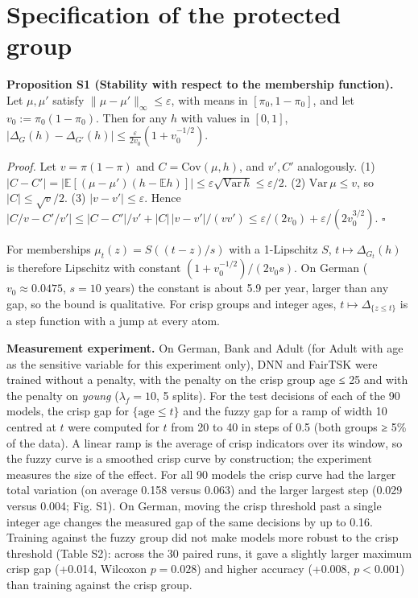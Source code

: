 \hypertarget{specification-of-the-protected-group}{%
\section{Specification of the protected group}\label{specification-of-the-protected-group}}

\textbf{Proposition S1 (Stability with respect to the membership function).} Let \(\mu,\mu'\) satisfy \(\|\mu - \mu'\|_{\infty} \leq \varepsilon\), with means in \([\pi_{0},1 - \pi_{0}]\), and let \(v_{0} := \pi_{0}(1 - \pi_{0})\). Then for any \(h\) with values in \([0,1]\), \(|\Delta_{G}(h) - \Delta_{G'}(h)| \leq \frac{\varepsilon}{2v_{0}}(1 + v_{0}^{-1/2})\).

\emph{Proof.} Let \(v = \pi(1 - \pi)\) and \(C = \mathrm{Cov}(\mu,h)\), and \(v',C'\) analogously. (1) \(|C - C'| = |\mathbb{E}[(\mu - \mu')(h - \mathbb{E}h)]| \leq \varepsilon\sqrt{\mathrm{Var}\,h} \leq \varepsilon/2\). (2) \(\mathrm{Var}\,\mu \leq v\), so \(|C| \leq \sqrt{v}/2\). (3) \(|v - v'| \leq \varepsilon\). Hence \(|C/v - C'/v'| \leq |C - C'|/v' + |C|\,|v - v'|/(v v') \leq \varepsilon/(2v_0) + \varepsilon/(2v_0^{3/2})\). \(\square\)

For memberships \(\mu_t(z) = S((t - z)/s)\) with a 1-Lipschitz \(S\), \(t \mapsto \Delta_{G_t}(h)\) is therefore Lipschitz with constant \((1 + v_{0}^{-1/2})/(2v_{0}s)\). On German (\(v_0 \approx 0.0475\), \(s = 10\) years) the constant is about 5.9 per year, larger than any gap, so the bound is qualitative. For crisp groups and integer ages, \(t \mapsto \Delta_{\{z \leq t\}}\) is a step function with a jump at every atom.

\textbf{Measurement experiment.} On German, Bank and Adult (for Adult with age as the sensitive variable for this experiment only), DNN and FairTSK were trained without a penalty, with the penalty on the crisp group age ≤ 25 and with the penalty on \emph{young} (\(\lambda_f = 10\), 5 splits). For the test decisions of each of the 90 models, the crisp gap for \(\{\text{age} \leq t\}\) and the fuzzy gap for a ramp of width 10 centred at \(t\) were computed for \(t\) from 20 to 40 in steps of 0.5 (both groups ≥ 5\% of the data). A linear ramp is the average of crisp indicators over its window, so the fuzzy curve is a smoothed crisp curve by construction; the experiment measures the size of the effect. For all 90 models the crisp curve had the larger total variation (on average 0.158 versus 0.063) and the larger largest step (0.029 versus 0.004; Fig. S1). On German, moving the crisp threshold past a single integer age changes the measured gap of the same decisions by up to 0.16. Training against the fuzzy group did not make models more robust to the crisp threshold (Table S2): across the 30 paired runs, it gave a slightly larger maximum crisp gap (+0.014, Wilcoxon \(p = 0.028\)) and higher accuracy (+0.008, \(p < 0.001\)) than training against the crisp group.

